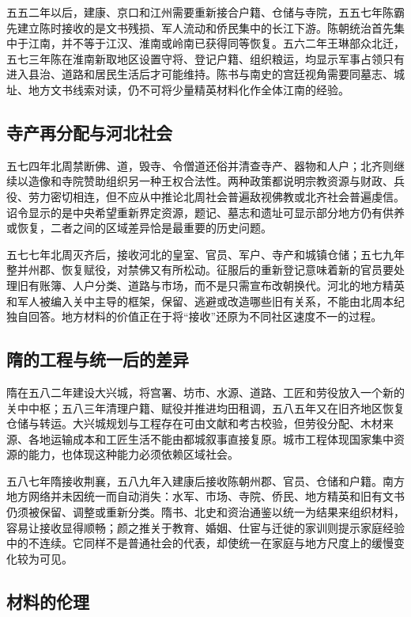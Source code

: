 五五二年以后，建康、京口和江州需要重新接合户籍、仓储与寺院，五五七年陈霸先建立陈时接收的是文书残损、军人流动和侨民集中的长江下游。陈朝统治首先集中于江南，并不等于江汉、淮南或岭南已获得同等恢复。五六二年王琳部众北迁，五七三年陈在淮南新取地区设置守将、登记户籍、组织粮运，均显示军事占领只有进入县治、道路和居民生活后才可能维持。陈书与南史的宫廷视角需要同墓志、城址、地方文书线索对读，仍不可将少量精英材料化作全体江南的经验。

\subsection{寺产再分配与河北社会}

五七四年北周禁断佛、道，毁寺、令僧道还俗并清查寺产、器物和人户；北齐则继续以造像和寺院赞助组织另一种王权合法性。两种政策都说明宗教资源与财政、兵役、劳力密切相连，但不应从中推论北周社会普遍敌视佛教或北齐社会普遍虔信。诏令显示的是中央希望重新界定资源，题记、墓志和遗址可显示部分地方仍有供养或恢复，二者之间的区域差异恰是最重要的历史问题。

五七七年北周灭齐后，接收河北的皇室、官员、军户、寺产和城镇仓储；五七九年整并州郡、恢复赋役，对禁佛又有所松动。征服后的重新登记意味着新的官员要处理旧有账簿、人户分类、道路与市场，而不是只需宣布改朝换代。河北的地方精英和军人被编入关中主导的框架，保留、逃避或改造哪些旧有关系，不能由北周本纪独自回答。地方材料的价值正在于将“接收”还原为不同社区速度不一的过程。

\subsection{隋的工程与统一后的差异}

隋在五八二年建设大兴城，将宫署、坊市、水源、道路、工匠和劳役放入一个新的关中中枢；五八三年清理户籍、赋役并推进均田租调，五八五年又在旧齐地区恢复仓储与转运。大兴城规划与工程存在可由文献和考古校验，但劳役分配、木材来源、各地运输成本和工匠生活不能由都城叙事直接复原。城市工程体现国家集中资源的能力，也体现这种能力必须依赖区域社会。

五八七年隋接收荆襄，五八九年入建康后接收陈朝州郡、官员、仓储和户籍。南方地方网络并未因统一而自动消失：水军、市场、寺院、侨民、地方精英和旧有文书仍须被保留、调整或重新分类。隋书、北史和资治通鉴以统一为结果来组织材料，容易让接收显得顺畅；颜之推关于教育、婚姻、仕宦与迁徙的家训则提示家庭经验中的不连续。它同样不是普通社会的代表，却使统一在家庭与地方尺度上的缓慢变化较为可见。

\subsection{材料的伦理}

